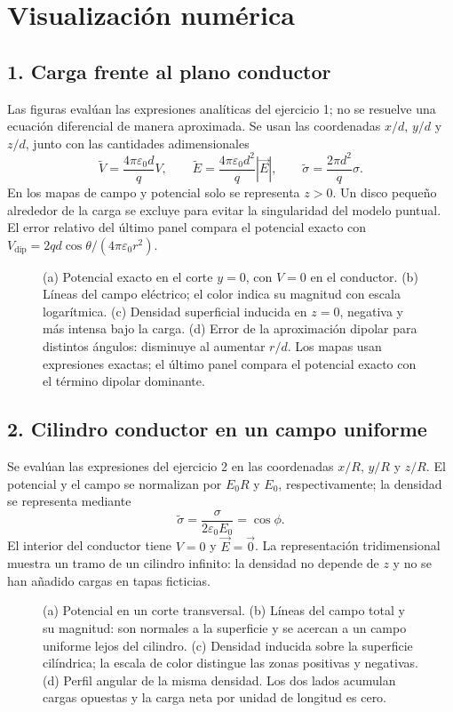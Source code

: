 \documentclass[11pt]{article}
\providecommand{\graficanumerica}[2][]{%
}
\begin{document}
\clearpage
\section*{Visualización numérica}
\subsection*{1. Carga frente al plano conductor}
Las figuras evalúan las expresiones analíticas del ejercicio 1; no se
resuelve una ecuación diferencial de manera aproximada. Se usan las
coordenadas $x/d$, $y/d$ y $z/d$, junto con las cantidades adimensionales
\[
 \widetilde V=\frac{4\pi\varepsilon_0d}{q}V,\qquad
 \widetilde E=\frac{4\pi\varepsilon_0d^2}{q}|\vec{E}|,\qquad
 \widetilde\sigma=\frac{2\pi d^2}{q}\sigma.
\]
En los mapas de campo y potencial solo se representa $z>0$. Un disco
pequeño alrededor de la carga se excluye para evitar la singularidad del
modelo puntual. El error relativo del último panel compara el potencial
exacto con $V_{\mathrm{dip}}=2qd\cos\theta/(4\pi\varepsilon_0r^2)$.

\begin{figure}[!htbp]
\centering
\graficanumerica[width=0.98\textwidth]{carga_plano_visualizacion}
\caption{(a) Potencial exacto en el corte $y=0$, con $V=0$ en el
conductor. (b) Líneas del campo eléctrico; el color indica su magnitud
con escala logarítmica. (c) Densidad superficial inducida en $z=0$,
negativa y más intensa bajo la carga. (d) Error de la aproximación
dipolar para distintos ángulos: disminuye al aumentar $r/d$. Los mapas
usan expresiones exactas; el último panel compara el potencial exacto
con el término dipolar dominante.}
\label{fig:numerica-plano}
\end{figure}

\clearpage
\subsection*{2. Cilindro conductor en un campo uniforme}
Se evalúan las expresiones del ejercicio 2 en las coordenadas $x/R$,
$y/R$ y $z/R$. El potencial y el campo se normalizan por $E_0R$ y $E_0$,
respectivamente; la densidad se representa mediante
\[
 \widetilde\sigma=\frac{\sigma}{2\varepsilon_0E_0}=\cos\phi.
\]
El interior del conductor tiene $V=0$ y $\vec{E}=\vec{0}$. La representación
tridimensional muestra un tramo de un cilindro infinito: la densidad no
depende de $z$ y no se han añadido cargas en tapas ficticias.

\begin{figure}[!htbp]
\centering
\graficanumerica[width=0.98\textwidth]{cilindro_uniforme_visualizacion}
\caption{(a) Potencial en un corte transversal. (b) Líneas del campo
total y su magnitud: son normales a la superficie y se acercan a un
campo uniforme lejos del cilindro. (c) Densidad inducida sobre la
superficie cilíndrica; la escala de color distingue las zonas positivas
y negativas. (d) Perfil angular de la misma densidad. Los dos lados
acumulan cargas opuestas y la carga neta por unidad de longitud es cero.}
\label{fig:numerica-cilindro}
\end{figure}
\end{document}
